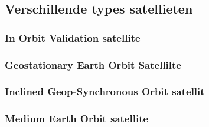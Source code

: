 \subsection{Verschillende types satellieten}
\label{LVTS}
\subsubsection{In Orbit Validation satellite}
\subsubsection{Geostationary Earth Orbit Satellilte}
\subsubsection{Inclined Geop-Synchronous Orbit satellit}
\subsubsection{Medium Earth Orbit satellite}

